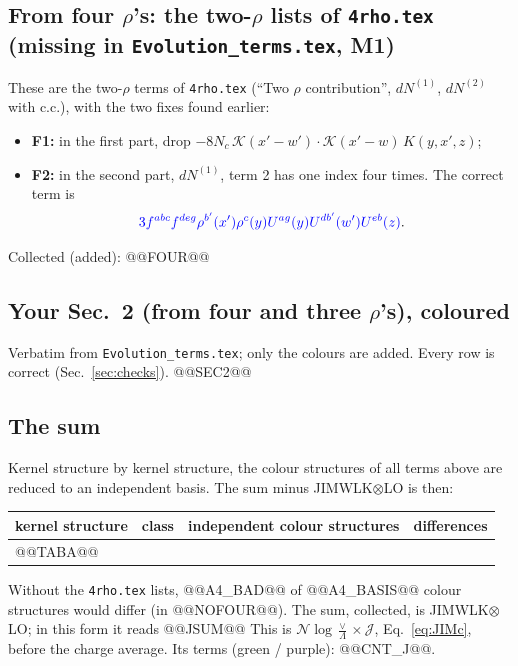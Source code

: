 \documentclass[10pt]{article}
\numberwithin{equation}{section}
\newcommand{\new}[1]{{\color{blue}#1}}
\newcommand{\old}[1]{{\color{red}#1}}
\begin{document}
\subsection{From four $\rho$'s: the two-$\rho$ lists of \texttt{4rho.tex} (missing in \texttt{Evolution\_terms.tex}, M1)}
These are the two-$\rho$ terms of \texttt{4rho.tex} (``Two $\rho$ contribution'', $dN^{(1)}$, $dN^{(2)}$ with c.c.), with the two fixes found earlier:
\begin{itemize}
\item \textbf{F1:} in the first part, drop \old{$-8N_c\,\mathcal K(x'-w')\cdot\mathcal K(x'-w)\,K(y,x',z)$};
\item \textbf{F2:} in the second part, $dN^{(1)}$, term 2 has one index four times. The correct term is
\begin{equation*}\new{3f^{abc}f^{deg}\rho^{b'}(x')\rho^c(y)U^{ag}(y)U^{db'}(w')U^{eb}(z)}.\end{equation*}
\end{itemize}
Collected (\new{added}):
@@FOUR@@

\subsection{Your Sec.~2 (from four and three $\rho$'s), coloured}
Verbatim from \texttt{Evolution\_terms.tex}; only the colours are added. Every row is correct (Sec.~\ref{sec:checks}).
@@SEC2@@

\subsection{The sum}
Kernel structure by kernel structure, the colour structures of all terms above are reduced to an independent basis. The sum minus JIMWLK$\otimes$LO is then:
\begin{table}[H]\centering\small
\begin{tabular}{@{}llrr@{}}\toprule
kernel structure & class & independent colour structures & differences\\\midrule
@@TABA@@
\bottomrule
\end{tabular}
\end{table}
\noindent Without the \texttt{4rho.tex} lists, @@A4_BAD@@ of @@A4_BASIS@@ colour structures would differ (in @@NOFOUR@@). The sum, collected, is JIMWLK$\otimes$LO; in this form it reads
@@JSUM@@
This is $\mathcal N\log\frac{\vee}{\Lambda}\times\mathcal J$, Eq.~\eqref{eq:JIMc}, before the charge average. Its terms (green / purple): @@CNT_J@@.
\end{document}
